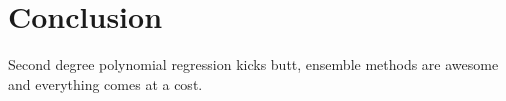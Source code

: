\section{Conclusion}
\label{sec:five}

Second degree polynomial regression kicks butt, ensemble methods are awesome and
everything comes at a cost.

